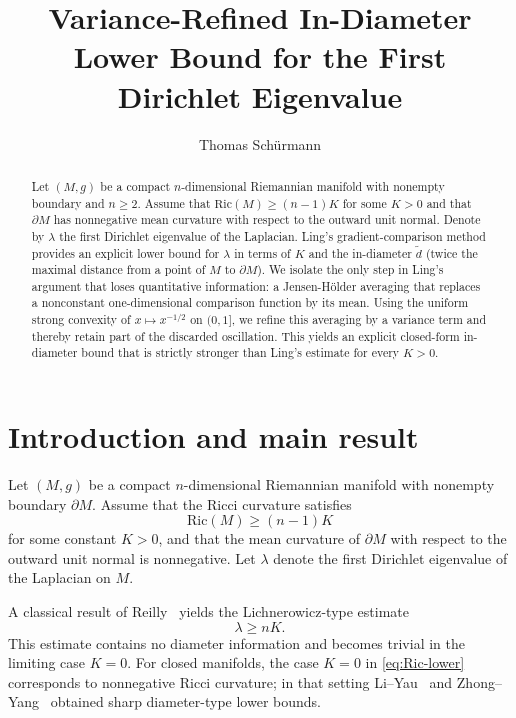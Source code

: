 \documentclass[11pt]{article}
\title{Variance-Refined In-Diameter Lower Bound for the First Dirichlet Eigenvalue}
\author{Thomas Sch\"urmann}
\affil{D\"usseldorf, Germany}
\date{}
\newcommand{\Ric}{\mathrm{Ric}}
\newcommand{\de}{\tilde d}
\begin{document}
\maketitle

\begin{abstract}
	Let $(M,g)$ be a compact $n$-dimensional Riemannian manifold with nonempty boundary and $n\geq 2$. Assume that ${\Ric(M)\ge (n-1)K}$ for some ${K>0}$ and that $\partial M$ has nonnegative mean curvature with respect to the outward unit normal.
	Denote by $\lambda$ the first Dirichlet eigenvalue of the Laplacian.
	Ling’s gradient-comparison method \cite{Ling2006} provides an explicit lower bound for $\lambda$ in terms of $K$ and the in-diameter $\de$ (twice the maximal distance from a point of $M$ to $\partial M$).
	We isolate the only step in Ling’s argument that loses quantitative information: a Jensen-H\"older averaging that replaces a nonconstant one-dimensional comparison function by its mean.
	Using the uniform strong convexity of $x\mapsto x^{-1/2}$ on $(0,1]$, we refine this averaging by a variance term and thereby retain part of the discarded oscillation.
	This yields an explicit closed-form in-diameter bound that is strictly stronger than Ling’s estimate for every $K>0$.
\end{abstract}

\section{Introduction and main result}

Let $(M,g)$ be a compact $n$-dimensional Riemannian manifold with nonempty boundary $\partial M$.
Assume that the Ricci curvature satisfies
\begin{equation}
\label{eq:Ric-lower}
\Ric(M)\ge (n-1)K
\end{equation}
for some constant $K>0$, and that the mean curvature of $\partial M$ with respect to the outward unit normal is nonnegative.
Let $\lambda$ denote the first Dirichlet eigenvalue of the Laplacian on $M$.

A classical result of Reilly~\cite{Reilly1977} yields the Lichnerowicz-type estimate
\begin{equation}
\lambda \ge nK.
\end{equation}
This estimate contains no diameter information and becomes trivial in the limiting case $K=0$.
For closed manifolds, the case $K=0$ in \eqref{eq:Ric-lower} corresponds to nonnegative Ricci curvature; in that setting Li--Yau~\cite{LiYau1980} and Zhong--Yang~\cite{ZhongYang1984} obtained sharp diameter-type lower bounds.
\end{document}
